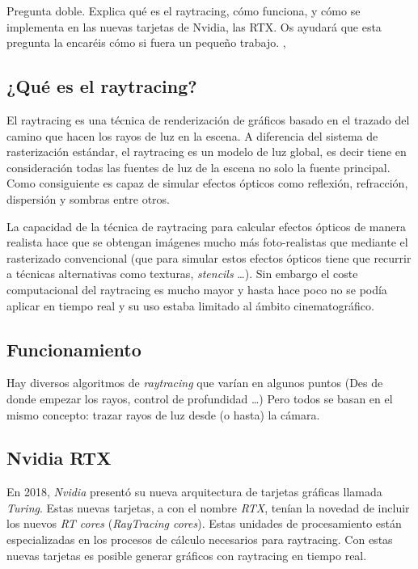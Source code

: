 
\begin{pregunta}{Pregunta doble. Explica qué es el raytracing, cómo funciona, y cómo se
    implementa en las nuevas tarjetas de Nvidia, las RTX. Os ayudará que esta
pregunta la encaréis cómo si fuera un pequeño trabajo.} \sep{}

\subsection*{¿Qué es el raytracing?}

El raytracing es una técnica de renderizaci\'on de gráficos basado en el trazado
del camino que hacen los rayos de luz en la escena. A diferencia del sistema de
rasterización estándar, el raytracing es un modelo de luz global, es decir tiene
en consideración todas las fuentes de luz de la escena no solo la fuente
principal. Como consiguiente es capaz de simular efectos ópticos como
reflexión, refracción, dispersión y sombras entre otros.

La capacidad de la técnica de raytracing para calcular efectos ópticos de manera
realista hace que se obtengan imágenes mucho más foto-realistas que mediante el
rasterizado convencional (que para simular estos efectos ópticos tiene que
recurrir a técnicas alternativas como texturas, \emph{stencils} \dots). Sin
embargo el coste computacional del raytracing es mucho mayor y hasta hace poco
no se podía aplicar en tiempo real y su uso estaba limitado al ámbito
cinematográfico.


\subsection*{Funcionamiento}

Hay diversos algoritmos de \emph{raytracing} que varían en algunos puntos (Des
de donde empezar los rayos, control de profundidad \dots) Pero todos se basan en
el mismo concepto: trazar rayos de luz desde (o hasta) la cámara.

\cite{leopold_english_2017}

\subsection*{Nvidia RTX}

En 2018, \emph{Nvidia} presentó su nueva arquitectura de tarjetas gráficas llamada \emph{Turing}.
Estas nuevas tarjetas, a con el nombre \emph{RTX}, tenían la novedad de incluir
los nuevos \emph{RT cores} (\emph{RayTracing cores}). Estas unidades de
procesamiento están especializadas en los procesos de cálculo necesarios para
raytracing. Con estas nuevas tarjetas es posible generar gráficos con raytracing
en tiempo real. \cite{noauthor_introducing_2018}

\end{pregunta}
